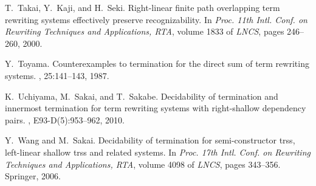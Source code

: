 \documentclass{LMCS}
\theoremstyle{plain}
\begin{document}
\begin{thebibliography}{BKdV03}
T.~Takai, Y.~Kaji, and H.~Seki.
\newblock Right-linear finite path overlapping term rewriting systems
  effectively preserve recognizability.
\newblock In {\em Proc. 11th Intl. Conf. on Rewriting Techniques and
  Applications, RTA}, volume 1833 of {\em LNCS}, pages 246--260, 2000.

Y.~Toyama.
\newblock Counterexamples to termination for the direct sum of term rewriting
  systems.
, 25:141--143, 1987.

K.~Uchiyama, M.~Sakai, and T.~Sakabe.
\newblock Decidability of termination and innermost termination for term
  rewriting systems with right-shallow dependency pairs.
, E93-D(5):953--962,
  2010.

Y.~Wang and M.~Sakai.
\newblock Decidability of termination for semi-constructor trss, left-linear
  shallow trss and related systems.
\newblock In {\em Proc. 17th Intl. Conf. on Rewriting Techniques and
  Applications, RTA}, volume 4098 of {\em LNCS}, pages 343--356. Springer,
  2006.

\end{thebibliography}
\end{document}
